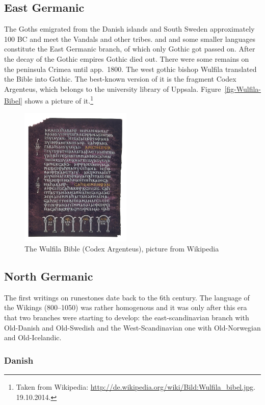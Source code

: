 \subsection{East Germanic}

The Goths emigrated from the Danish islands and South Sweden approximately 100 BC and meet the
Vandals and other tribes.   and  and some smaller languages constitute the East Germanic branch, of which only Gothic got passed on.
After the decay of the Gothic empires Gothic died out. There were some remains on the peninsula
Crimea until app.\ 1800. The west gothic bishop Wulfila translated the Bible into Gothic. The
best-known version of it is the fragment Codex Argenteus, which belongs to the university library of
Uppsala. Figure~\vref{fig-Wulfila-Bibel} shows a picture of it.\footnote{
Taken from Wikipedia: \url{http://de.wikipedia.org/wiki/Bild:Wulfila_bibel.jpg}. 19.10.2014.
}
\begin{figure}
\includegraphics[width=53mm]{Pictures/Wulfila_bibel}
\caption{\label{fig-Wulfila-Bibel}The Wulfila Bible (Codex Argenteus), picture from Wikipedia}
\end{figure}



\subsection{North Germanic}

The first writings on runestones date back to the 6th century. The language of the Wikings
(800--1050) was rather homogenous and it was only after this era that two branches were starting to
develop: the east-scandinavian branch with Old-Danish and Old-Swedish and the West-Scandinavian one
with Old-Norwegian and Old-Icelandic.


\subsubsection{Danish}

